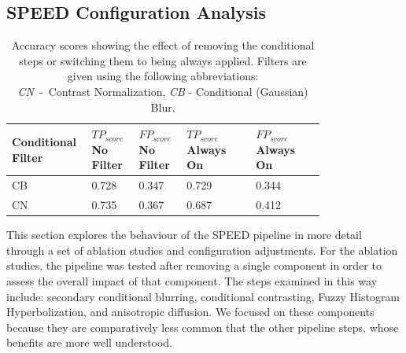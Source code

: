 \documentclass[conference]{IEEEtran}
\begin{document}
\subsection{SPEED Configuration Analysis}
\label{subsec:SPEED_configuration}


\begin{table}[]
    \centering
    \begin{tabular}{p{0.13\linewidth} | p{0.13\linewidth} | p{0.13\linewidth} | p{0.20\linewidth} | p{0.20\linewidth}}
    Conditional Filter & $TP_{score}$ No Filter & $FP_{score}$ No Filter & $TP_{score}$ Always On & $FP_{score}$ Always On  \\
     \hline
    
    CB & 0.728 & 0.347 & 0.729 & 0.344   \\
    CN & 0.735 & 0.367 & 0.687 & 0.412   \\
    \end{tabular}
    \caption{Accuracy scores showing the effect of removing the conditional steps or switching them to being always applied. Filters are given using the following abbreviations: \\ \emph{CN}~-~Contrast Normalization, \emph{CB} - Conditional (Gaussian) Blur.  \label{tab:conditional_results}}
\end{table}

This section explores the behaviour of the SPEED pipeline in more detail through a set of ablation studies and configuration adjustments. For the ablation studies, the pipeline was tested after removing a single component in order to assess the overall impact of that component. The steps examined in this way include: secondary conditional blurring, conditional contrasting, Fuzzy Histogram Hyperbolization, and anisotropic diffusion. We focused on these components because they are comparatively less common that the other pipeline steps, whose benefits are more well understood.
\end{document}
